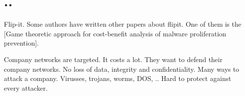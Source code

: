 \documentclass[10pt]{article}
\begin{document}
\section{..}

Flip-it. Some authors have written other papers about flipit. One of them is the [Game theoretic approach for cost-benefit analysis of malware proliferation prevention]. 


Company networks are targeted. It costs a lot. They want to defend their company networks. No loss of data, integrity and confidentiality.  Many ways to attack a company. Virusses, trojans, worms, DOS, .. Hard to protect against every attacker.


\end{document}
